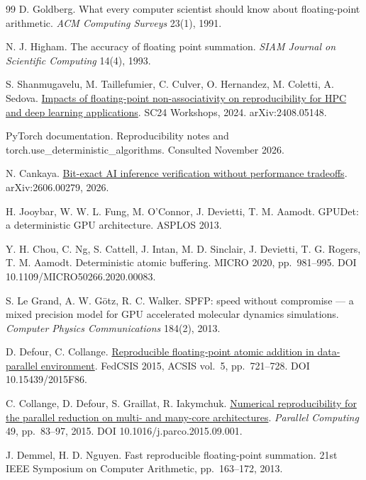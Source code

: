\documentclass[3p,10pt]{elsarticle}
\begin{document}
\begin{thebibliography}{99}
 D. Goldberg. What every computer scientist should know about
floating-point arithmetic. \emph{ACM Computing Surveys} 23(1), 1991.

 N. J. Higham. The accuracy of floating point summation. \emph{SIAM
Journal on Scientific Computing} 14(4), 1993.

 S. Shanmugavelu, M. Taillefumier, C. Culver, O. Hernandez, M. Coletti,
A. Sedova. \href{https://arxiv.org/pdf/2408.05148}{Impacts of
floating-point non-associativity on reproducibility for HPC and deep
learning applications}. SC24 Workshops, 2024. arXiv:2408.05148.

 PyTorch documentation. Reproducibility notes and
torch.use\_deterministic\_algorithms. Consulted November 2026.

 N. Cankaya. \href{https://arxiv.org/html/2606.00279v2}{Bit-exact AI
inference verification without performance tradeoffs}. arXiv:2606.00279,
2026.

 H. Jooybar, W. W. L. Fung, M. O'Connor, J. Devietti, T. M. Aamodt.
GPUDet: a deterministic GPU architecture. ASPLOS 2013.

 Y. H. Chou, C. Ng, S. Cattell, J. Intan, M. D. Sinclair, J. Devietti, T.
G. Rogers, T. M. Aamodt. Deterministic atomic buffering. MICRO 2020,
pp.~981--995. DOI 10.1109/MICRO50266.2020.00083.

 S. Le Grand, A. W. Götz, R. C. Walker. SPFP: speed without compromise
--- a mixed precision model for GPU accelerated molecular dynamics
simulations. \emph{Computer Physics Communications} 184(2), 2013.

 D. Defour, C. Collange.
\href{https://annals-csis.org/proceedings/2015/drp/86.html}{Reproducible
floating-point atomic addition in data-parallel environment}. FedCSIS
2015, ACSIS vol.~5, pp.~721--728. DOI 10.15439/2015F86.

 C. Collange, D. Defour, S. Graillat, R. Iakymchuk.
\href{https://hal-lirmm.ccsd.cnrs.fr/lirmm-01206348/document}{Numerical
reproducibility for the parallel reduction on multi- and many-core
architectures}. \emph{Parallel Computing} 49, pp.~83--97, 2015. DOI
10.1016/j.parco.2015.09.001.

 J. Demmel, H. D. Nguyen. Fast reproducible floating-point summation.
21st IEEE Symposium on Computer Arithmetic, pp.~163--172, 2013.


\end{thebibliography}
\end{document}
